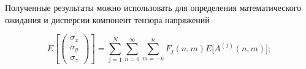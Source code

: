 
Полученные результаты можно использовать для определения математического ожидания и дисперсии компонент тензора напряжений

\begin{equation}
E\left[
\begin{pmatrix}
\sigma_x \\
\sigma_y \\
\sigma_z 
\end{pmatrix}
\right]=\sum_{j=1}^N\sum_{n=0}^\infty\sum_{m=-n}^n F_j(n,m)E\Big[A^{(j)}(n,m)\Big];
\label{eq:13:63}
\end{equation}

